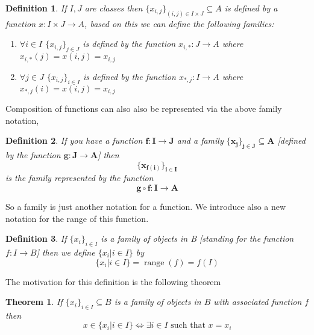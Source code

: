 \documentclass{book}
\newcommand{\tmmathbf}[1]{\ensuremath{\boldsymbol{#1}}}
\newcommand{\tmop}[1]{\ensuremath{\operatorname{#1}}}
\newtheorem{definition}{Definition}
{\theorembodyfont{\rmfamily}\newtheorem{example}{Example}}
\newtheorem{theorem}{Theorem}
\begin{document}
\begin{definition}
  \label{family index set is a product}If $I, J$ are classes then $\{ x_{i, j}
  \}_{(i, j) \in I \times J} \subseteq A$ is defined by a function $x : I
  \times J \rightarrow A$, based on this we can define the following families:
  \begin{enumerate}
    \item $\forall i \in I$ $\{ x_{i, j} \}_{j \in J}$ is defined by the
    function $x_{i, \ast} : J \rightarrow A$ where $x_{i, \ast} (j) = x (i, j)
    = x_{i, j}$
    
    \item $\forall j \in J$ $\{ x_{i, j} \}_{i \in I}$ is defined by the
    function $x_{\ast, j} : I \rightarrow A$ where $x_{\ast, j} (i) = x (i, j)
    = x_{i, j}$
  \end{enumerate}
\end{definition}

Composition of functions can also also be represented via the above family
notation,

\begin{definition}
  \label{family and function composition}If you have a function $\tmmathbf{f :
  I \rightarrow J}$ and a family $\tmmathbf{\{ x_j \}_{j \in J}}
  \tmmathbf{\subseteq A}$ [defined by the function $\tmmathbf{g : J
  \rightarrow A}$] then
  \[ \tmmathbf{\{ x_{f (i)} \}_{i \in I}} \]
  is the family represented by the function
  \[ \tmmathbf{g \circ f : I \rightarrow A} \]
\end{definition}

So a family is just another notation for a function. We introduce also a new
notation for the range of this function.

\begin{definition}
  \label{family range}{}If $\{ x_i \}_{i \in I}$
  is a family of objects in B [standing for the function $f : I \rightarrow
  B$] then we define $\{ x_i |i \in I \}$ by
  \[ \{ x_i |i \in I \} = \tmop{range} (f) = f (I) \]
\end{definition}

The motivation for this definition is the following theorem

\begin{theorem}
  \label{family range (1)}If $\{ x_i \}_{i \in I} \subseteq B$ is a family of
  objects in $B$ with associated function $f$ then
  \[ x \in \{ x_i |i \in I \} \Leftrightarrow \exists i \in I \text{ such
     that } x = x_i \]
\end{theorem}
\end{document}
